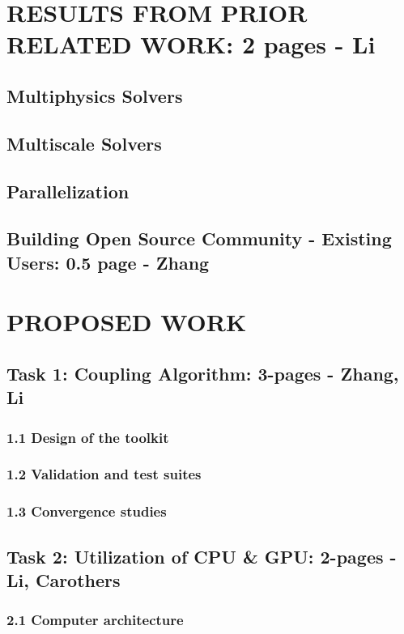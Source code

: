 \documentclass[12pt]{article}
\begin{document}
\section{RESULTS FROM PRIOR RELATED WORK: 2 pages - Li}

\subsection{Multiphysics Solvers}
\subsection{Multiscale Solvers}

%
\subsection{Parallelization}

\subsection{Building Open Source Community - Existing Users: 0.5 page - Zhang}

\section{PROPOSED WORK}

\subsection{Task 1: Coupling Algorithm: 3-pages - Zhang, Li }

\subsubsection{1.1 Design of the toolkit}
\subsubsection{1.2 Validation and test suites}
\subsubsection{1.3 Convergence studies}

\subsection{Task 2: Utilization of CPU \& GPU: 2-pages - Li, Carothers}
\subsubsection{2.1 Computer architecture}
\end{document}
